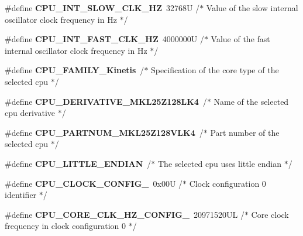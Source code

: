 \begin{DoxyCompactItemize}
\item 
\mbox{\label{group___c_p_u__module_ga925e4835a9fdb52f03bd354d62d6ba0a}} 
\#define {\bfseries C\+P\+U\+\_\+\+I\+N\+T\+\_\+\+S\+L\+O\+W\+\_\+\+C\+L\+K\+\_\+\+HZ}~32768\+U /$\ast$ Value of the slow internal oscillator clock frequency in Hz  $\ast$/
\item 
\mbox{\label{group___c_p_u__module_ga741ad9275688de8051f4bebd98a682bc}} 
\#define {\bfseries C\+P\+U\+\_\+\+I\+N\+T\+\_\+\+F\+A\+S\+T\+\_\+\+C\+L\+K\+\_\+\+HZ}~4000000\+U /$\ast$ Value of the fast internal oscillator clock frequency in Hz  $\ast$/
\item 
\mbox{\label{group___c_p_u__module_ga5bf3022570d9bb7a0d666f2dd9db6a34}} 
\#define {\bfseries C\+P\+U\+\_\+\+F\+A\+M\+I\+L\+Y\+\_\+\+Kinetis}~/$\ast$ Specification of the core type of the selected cpu $\ast$/
\item 
\mbox{\label{group___c_p_u__module_ga2a3e9dd6039080eb14febb4170e28908}} 
\#define {\bfseries C\+P\+U\+\_\+\+D\+E\+R\+I\+V\+A\+T\+I\+V\+E\+\_\+\+M\+K\+L25\+Z128\+L\+K4}~/$\ast$ Name of the selected cpu derivative $\ast$/
\item 
\mbox{\label{group___c_p_u__module_gac7935d3a36bc77e04bc16409e9ecdec3}} 
\#define {\bfseries C\+P\+U\+\_\+\+P\+A\+R\+T\+N\+U\+M\+\_\+\+M\+K\+L25\+Z128\+V\+L\+K4}~/$\ast$ Part number of the selected cpu $\ast$/
\item 
\mbox{\label{group___c_p_u__module_gab62ca27d0a6a531f35842a6e3a94b454}} 
\#define {\bfseries C\+P\+U\+\_\+\+L\+I\+T\+T\+L\+E\+\_\+\+E\+N\+D\+I\+AN}~/$\ast$ The selected cpu uses little endian $\ast$/
\item 
\mbox{\label{group___c_p_u__module_ga4d7ade6a1c335a7e5233938aa9197157}} 
\#define {\bfseries C\+P\+U\+\_\+\+C\+L\+O\+C\+K\+\_\+\+C\+O\+N\+F\+I\+G\+\_}~0x00\+U /$\ast$ Clock configuration 0 identifier $\ast$/
\item 
\mbox{\label{group___c_p_u__module_ga6fe0b841d40421ee48af4a4e01e48ddf}} 
\#define {\bfseries C\+P\+U\+\_\+\+C\+O\+R\+E\+\_\+\+C\+L\+K\+\_\+\+H\+Z\+\_\+\+C\+O\+N\+F\+I\+G\+\_}~20971520\+U\+L /$\ast$ Core clock frequency in clock configuration 0 $\ast$/

\end{DoxyCompactItemize}
